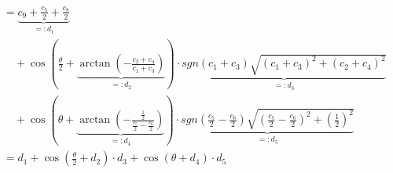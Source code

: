 \begin{equation}
\begin{split}
            &= \underbrace{c_9 + \frac{c_5}{2} + \frac{c_8}{2}}_{=: d_1} \\
                &\quad + \cos\left(\frac\theta2 + \underbrace{\arctan\left(-\frac{c_2 + c_4}{c_1 + c_3}\right)}_{=: d_2}\right) \cdot \underbrace{sgn\left(c_1 + c_3\right) \sqrt{(c_1 + c_3)^2 + (c_2 + c_4)^2}}_{=: d_3} \\
                &\quad + \cos\left(\theta + \underbrace{\arctan\left(-\frac{\frac12}{\frac{c_5}{2} - \frac{c_6}{2}}\right)}_{=: d_4}\right) \cdot \underbrace{sgn\left(\frac{c_5}{2} - \frac{c_6}{2}\right) \sqrt{\left(\frac{c_5}{2} - \frac{c_6}{2}\right)^2 + \left(\frac12\right)^2}}_{=: d_5} \\
            &= d_1 + \cos\left(\frac\theta2 + d_2\right) \cdot d_3 + \cos\left(\theta + d_4\right) \cdot d_5
    \end{split}
\end{equation}